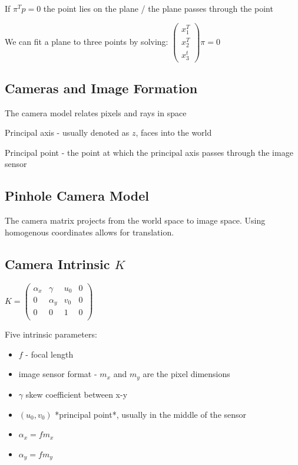 If $\pi^T p = 0$ the point lies on the plane / the plane passes through the point

We can fit a plane to three points by solving:
$\left( \begin{matrix} x_1^T \\ x_2^T \\ x_3^t \end{matrix} \right) \pi = 0 $

\subsection{Cameras and Image Formation}

The camera model relates pixels and rays in space

Principal axis - usually denoted as $z$, faces into the world

Principal point - the point at which the principal axis passes through the image sensor

\subsection{Pinhole Camera Model}
The camera matrix projects from the world space to image space. Using homogenous coordinates allows for translation.

\subsection{Camera Intrinsic $K$}
$K = \left( \begin{matrix} 
\alpha_x & \gamma & u_0 & 0 \\
0 & \alpha_y  & v_0 & 0 \\
0 & 0 &  1 & 0 \\
\end{matrix}
\right) $

Five intrinsic parameters:
\begin{itemize}
\item $f$ - focal length
\item  image sensor format - $m_x$ and $m_y$ are the pixel dimensions
\item  $\gamma$ skew coefficient between x-y
\item  $(u_0,v_0)$ *principal point*, usually in the middle of the sensor
\item  $\alpha_x = f m_x $
\item  $\alpha_y = f m_y $
\end{itemize}

